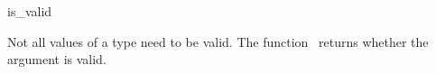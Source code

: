 \begin{ccRefFunction}{is_valid}

\ccDefinition

Not all values of a type need to be valid.
The function \ccRefName\ returns whether the argument is valid. 



\ccSeeAlso

\\

\end{ccRefFunction}
